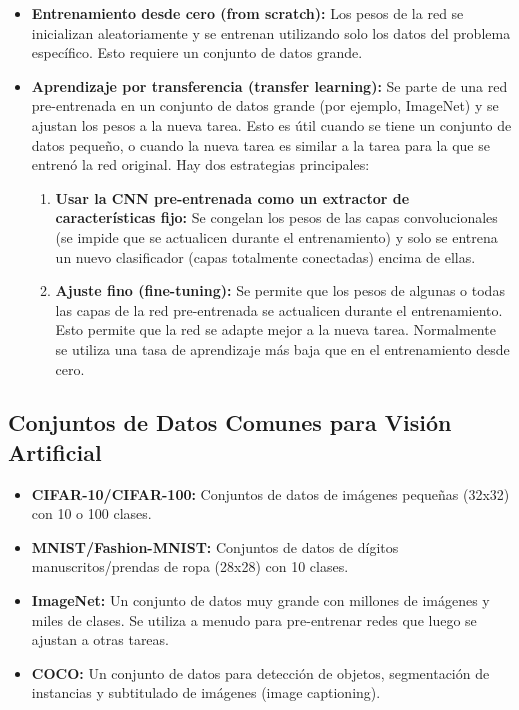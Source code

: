 \documentclass{article}
\begin{document}
\begin{itemize}
    \item \textbf{Entrenamiento desde cero (from scratch):}  Los pesos de la red se inicializan aleatoriamente y se entrenan utilizando solo los datos del problema específico.  Esto requiere un conjunto de datos grande.
    \item \textbf{Aprendizaje por transferencia (transfer learning):}  Se parte de una red pre-entrenada en un conjunto de datos grande (por ejemplo, ImageNet) y se ajustan los pesos a la nueva tarea.  Esto es útil cuando se tiene un conjunto de datos pequeño, o cuando la nueva tarea es similar a la tarea para la que se entrenó la red original. Hay dos estrategias principales:
        \begin{enumerate}
            \item \textbf{Usar la CNN pre-entrenada como un extractor de características fijo:}  Se congelan los pesos de las capas convolucionales (se impide que se actualicen durante el entrenamiento) y solo se entrena un nuevo clasificador (capas totalmente conectadas) encima de ellas.
            \item \textbf{Ajuste fino (fine-tuning):}  Se permite que los pesos de algunas o todas las capas de la red pre-entrenada se actualicen durante el entrenamiento.  Esto permite que la red se adapte mejor a la nueva tarea.  Normalmente se utiliza una tasa de aprendizaje más baja que en el entrenamiento desde cero.
        \end{enumerate}
\end{itemize}

\subsection{Conjuntos de Datos Comunes para Visión Artificial}

\begin{itemize}
    \item \textbf{CIFAR-10/CIFAR-100:}  Conjuntos de datos de imágenes pequeñas (32x32) con 10 o 100 clases.
    \item \textbf{MNIST/Fashion-MNIST:} Conjuntos de datos de dígitos manuscritos/prendas de ropa (28x28) con 10 clases.
    \item \textbf{ImageNet:}  Un conjunto de datos muy grande con millones de imágenes y miles de clases.  Se utiliza a menudo para pre-entrenar redes que luego se ajustan a otras tareas.
    \item \textbf{COCO:}  Un conjunto de datos para detección de objetos, segmentación de instancias y subtitulado de imágenes (image captioning).
\end{itemize}
\end{document}
